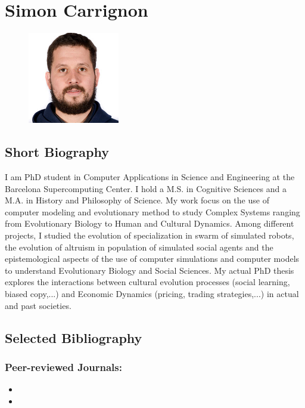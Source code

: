 \documentclass[12pt,a4paper]{article}
\begin{document}
\section*{Simon Carrignon}

\begin{figure}[h]
	\hfill \includegraphics[width=4cm]{scarrign.png}
\end{figure}

\subsection*{Short Biography}
I am PhD student in Computer Applications in Science and Engineering at the Barcelona Supercomputing Center. I hold a M.S. in Cognitive Sciences and a M.A. in History and Philosophy of Science. My work focus on the use of computer modeling and evolutionary method to study Complex Systems ranging from Evolutionary Biology to Human and Cultural Dynamics. Among different projects, I studied the evolution of specialization in swarm of simulated robots, the evolution of altruism in population of simulated social agents and the epistemological aspects of the use of computer simulations and computer models to understand Evolutionary Biology and Social Sciences. My actual PhD thesis explores the interactions between cultural evolution processes (social learning, biased copy,...) and Economic Dynamics (pricing, trading strategies,...) in actual and past societies.


\subsection*{Selected Bibliography}

\subsubsection*{Peer-reviewed Journals:}

\begin{itemize}
    \item  {}

    \item  {}
\end{itemize}
\end{document}
